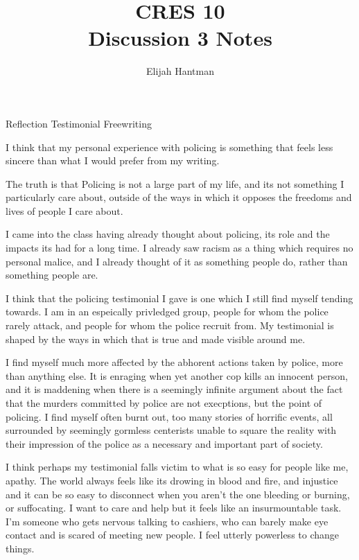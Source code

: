 \documentclass{report}
\title{\Huge{CRES 10}\\Discussion 3 Notes}
\author{\huge{Elijah Hantman}}
\date{}
\begin{document}
\maketitle
\newpage

\begin{description}
    \item {\large Reflection Testimonial Freewriting}
        \begin{mdframed}
            I think that my personal experience with
            policing is something that feels less sincere
            than what I would prefer from my writing.

            The truth is that Policing is not a large part
            of my life, and its not something I particularly
            care about, outside of the ways in which it opposes
            the freedoms and lives of people I care about. 

            I came into the class having already thought about
            policing, its role and the impacts its had for a
            long time. I already saw racism as a thing which
            requires no personal malice, and I already thought of
            it as something people do, rather than something
            people are.

            I think that the policing testimonial I gave is one which
            I still find myself tending towards. I am in an espeically
            privledged group, people for whom the police rarely attack,
            and people for whom the police recruit from. My testimonial
            is shaped by the ways in which that is true and made visible
            around me. 

            I find myself much more affected by the abhorent actions taken
            by police, more than anything else. It is enraging when yet
            another cop kills an innocent person, and it is maddening
            when there is a seemingly infinite argument about the fact
            that the murders committed by police are not execptions,
            but the point of policing. I find myself often burnt out, too
            many stories of horrific events, all surrounded by seemingly
            gormless centerists unable to square the reality with their
            impression of the police as a necessary and important part of
            society. 

            I think perhaps my testimonial falls victim to what is so easy for
            people like me, apathy. The world always feels like its drowing in
            blood and fire, and injustice and it can be so easy to disconnect
            when you aren't the one bleeding or burning, or suffocating. I want
            to care and help but it feels like an insurmountable task. I'm someone
            who gets nervous talking to cashiers, who can barely make eye contact
            and is scared of meeting new people. I feel utterly powerless to change
            things.


\end{mdframed}
\end{description}
\end{document}
